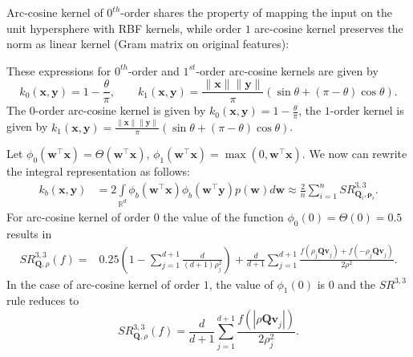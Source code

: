 Arc-cosine kernel of $0^{th}$-order shares the property of mapping the input on the unit hypersphere with RBF kernels, while order $1$ arc-cosine kernel preserves the norm as linear kernel (Gram matrix on original features):

These expressions for $0^{th}$-order and $1^{st}$-order arc-cosine kernels are given by
\[
k_0(\mathbf{x},\mathbf{y}) = 1 - \frac{\theta}{\pi},\qquad k_1(\mathbf{x},\mathbf{y}) = \frac{\|\mathbf{x}\|\|\mathbf{y}\|}{\pi}(\sin\theta + (\pi - \theta)\cos\theta).
\]
The $0$-order arc-cosine kernel is given by ${k_0(\mathbf{x},\mathbf{y}) = 1 - \frac{\theta}{\pi}}$, the $1$-order kernel is given by ${k_1(\mathbf{x},\mathbf{y}) = \frac{\|\mathbf{x}\|\|\mathbf{y}\|}{\pi}(\sin\theta + (\pi - \theta)\cos\theta)}$.

Let
${\phi_0(\mathbf{w}^{\boldsymbol{\top}}\mathbf{x}) = \Theta(\mathbf{w}^{\boldsymbol{\top}}\mathbf{x})}$,
${\phi_1(\mathbf{w}^{\boldsymbol{\top}}\mathbf{x}) = \max (0, \mathbf{w}^{\boldsymbol{\top}}\mathbf{x})}$. We now can rewrite the integral representation as follows:
\begin{align*}
k_{b}(\mathbf{x},\mathbf{y}) &= 2 \int\limits_{\mathbb{R}^d}  \phi_b(\mathbf{w}^{\boldsymbol{\top}}\mathbf{x}) \phi_b(\mathbf{w}^{\boldsymbol{\top}}\mathbf{y}) p(\mathbf{w}) d\mathbf{w} \approx \frac{2}{n} \sum\limits_{i=1}^n SR_{\mathbf{Q}_i,\boldsymbol{\rho}_i}^{3,3}.
\end{align*}
For arc-cosine kernel of order $0$ the value of the function $\phi_0(0) = \Theta(0) = 0.5$ results in
\begin{equation*}
\begin{split}
SR^{3,3}_{\mathbf{Q}, \rho}(f) = & 0.25 \left (1 - \sum_{j = 1}^{d + 1}\frac{d}{(d + 1)\rho_j^2} \right ) + \frac{d}{d+1}\sum\limits_{j=1}^{d+1} \frac{f(\rho_j \mathbf{Qv}_j) + f(-\rho_j \mathbf{Qv}_j)}{2\rho^2}.
\end{split}
\end{equation*}
In the case of arc-cosine kernel of order $1$, the value of $\phi_1(0)$ is $0$ and the $SR^{3,3}$ rule reduces to
\begin{equation*}
SR^{3,3}_{\mathbf{Q}, \rho}(f) = \frac{d}{d+1}\sum\limits_{j=1}^{d+1} \frac{f(|\rho \mathbf{Qv}_j|)}{2\rho_j^2}.
\end{equation*}